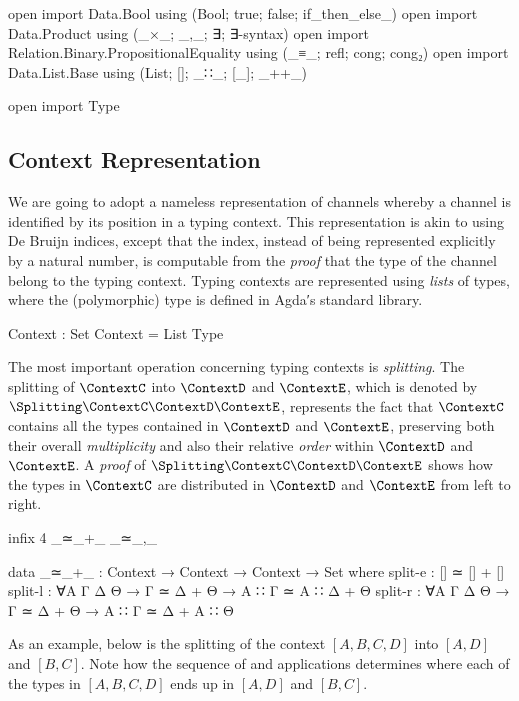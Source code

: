 \begin{code}[hide]
open import Data.Bool using (Bool; true; false; if_then_else_)
open import Data.Product using (_×_; _,_; ∃; ∃-syntax)
open import Relation.Binary.PropositionalEquality using (_≡_; refl; cong; cong₂)
open import Data.List.Base using (List; []; _∷_; [_]; _++_)

open import Type
\end{code}

\subsection{Context Representation}
\label{sec:context-agda}

We are going to adopt a nameless representation of channels whereby a channel is
identified by its position in a typing context. This representation is akin to
using De Bruijn indices, except that the index, instead of being represented
explicitly by a natural number, is computable from the \emph{proof} that the
type of the channel belong to the typing context.
%
Typing contexts are represented using \emph{lists} of types, where the
(polymorphic)  type is defined in Agda′s standard library.

\begin{code}
Context : Set
Context = List Type
\end{code}

The most important operation concerning typing contexts is \emph{splitting}. The
splitting of $\ContextC$ into $\ContextD$ and $\ContextE$, which is denoted by
$\Splitting\ContextC\ContextD\ContextE$, represents the fact that $\ContextC$
contains all the types contained in $\ContextD$ and $\ContextE$, preserving both
their overall \emph{multiplicity} and also their relative \emph{order} within
$\ContextD$ and $\ContextE$. A \emph{proof} of
$\Splitting\ContextC\ContextD\ContextE$ shows how the types in $\ContextC$ are
distributed in $\ContextD$ and $\ContextE$ from left to right.

\begin{code}[hide]
infix 4 _≃_+_ _≃_,_
\end{code}
\begin{code}
data _≃_+_ : Context → Context → Context → Set where
  split-e  : [] ≃ [] + []
  split-l  : ∀{A Γ Δ Θ} → Γ ≃ Δ + Θ → A ∷ Γ ≃ A ∷ Δ + Θ
  split-r  : ∀{A Γ Δ Θ} → Γ ≃ Δ + Θ → A ∷ Γ ≃ Δ + A ∷ Θ
\end{code}

As an example, below is the splitting of the context $[A, B, C, D]$ into $[A,
D]$ and $[B, C]$. Note how the sequence of 
and  applications determines where each of the
types in $[A, B, C, D]$ ends up in $[A, D]$ and $[B, C]$.

